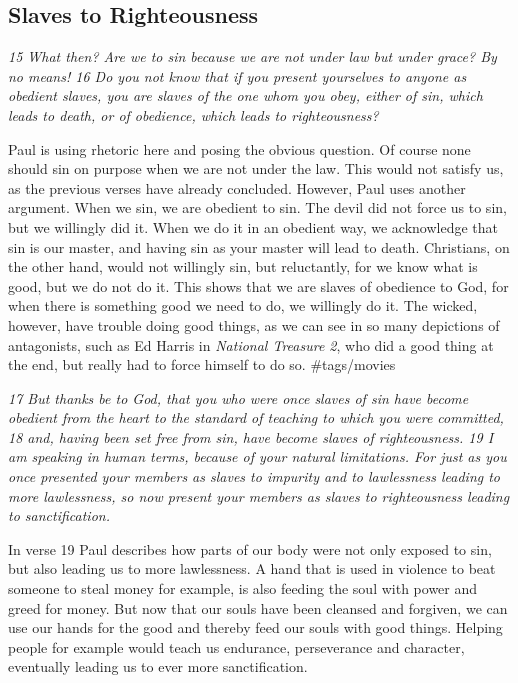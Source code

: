 \subsection{Slaves to Righteousness} \emph{15 What then? Are we to sin
because we are not under law but under grace? By no means! 16 Do you not
know that if you present yourselves to anyone as obedient slaves, you
are slaves of the one whom you obey, either of sin, which leads to
death, or of obedience, which leads to righteousness?}

Paul is using rhetoric here and posing the obvious question. Of course
none should sin on purpose when we are not under the law. This would not
satisfy us, as the previous verses have already concluded. However, Paul
uses another argument. When we sin, we are obedient to sin. The devil
did not force us to sin, but we willingly did it. When we do it in an
obedient way, we acknowledge that sin is our master, and having sin as
your master will lead to death. Christians, on the other hand, would not
willingly sin, but reluctantly, for we know what is good, but we do not
do it. This shows that we are slaves of obedience to God, for when there
is something good we need to do, we willingly do it. The wicked,
however, have trouble doing good things, as we can see in so many
depictions of antagonists, such as Ed Harris in \emph{National Treasure
2}, who did a good thing at the end, but really had to force himself to
do so. \#tags/movies

\emph{17 But thanks be to God, that you who were once slaves of sin have
become obedient from the heart to the standard of teaching to which you
were committed, 18 and, having been set free from sin, have become
slaves of righteousness. 19 I am speaking in human terms, because of
your natural limitations. For just as you once presented your members as
slaves to impurity and to lawlessness leading to more lawlessness, so
now present your members as slaves to righteousness leading to
sanctification.}

In verse 19 Paul describes how parts of our body were not only exposed
to sin, but also leading us to more lawlessness. A hand that is used in
violence to beat someone to steal money for example, is also feeding the
soul with power and greed for money. But now that our souls have been
cleansed and forgiven, we can use our hands for the good and thereby
feed our souls with good things. Helping people for example would teach
us endurance, perseverance and character, eventually leading us to ever
more sanctification.

